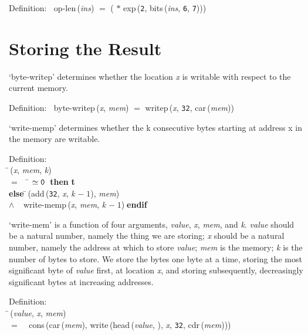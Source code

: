 \begin{tabbing}{\sc Definition}:$\;\;$
{\rm{op-len}}\,({\it{ins\/}}) $=$ ({} $*$ {\rm{exp}}\,({\tt{2}}, {\rm{bits}}\,({\it{ins\/}}, {\tt{6}}, {\tt{7}})))
\end{tabbing}

 \section{Storing the Result}

 `byte-writep' determines whether the location {\it{x\/}} is writable with respect to the current memory.
\begin{tabbing}{\sc Definition}:$\;\;$
{\rm{byte-writep}}\,({\it{x\/}}, {\it{mem\/}}) $=$ {\rm{writep}}\,({\it{x\/}}, {\tt{32}}, {\rm{car}}\,({\it{mem\/}}))
\end{tabbing}

 `write-memp' determines whether the k consecutive bytes starting at address x in the memory are writable.
\begin{tabbing}{\sc Definition}: \\  
\=\,({\it{x\/}}, {\it{mem\/}}, {\it{k\/}}) \\ 
$=$$\;\;\;\;$\= $\simeq {\tt{0}}$$\;\;${\bf then }{\bf{t}} \\ 
{\bf else }\=\,({\rm{add}}\,({\tt{32}}, {\it{x\/}}, {\it{k\/}} $-\;1$), {\it{mem\/}}) \\ 
$\wedge$$\;\;\;\;${\rm{write-memp}}\,({\it{x\/}}, {\it{mem\/}}, {\it{k\/}} $-\;1$)\-$\;${\bf  endif}\-\-
\end{tabbing}
  
 `write-mem' is a function of four arguments, {\it{value\/}}, {\it{x\/}}, {\it{mem\/}}, and {\it{k\/}}.
 {\it{value\/}} should be a natural number, namely the thing we are storing;
 {\it{x\/}} should be a natural number, namely the address at which to store
 {\it{value\/}};  {\it{mem\/}} is the memory;  {\it{k\/}} is the number of bytes to store.  We
 store the bytes one byte at a time, storing the most significant
 byte of {\it{value\/}} first, at location {\it{x\/}}, and storing subsequently,
 decreasingly significant bytes at increasing addresses.
\begin{tabbing}{\sc Definition}: \\  
\=\,({\it{value\/}}, {\it{x\/}}, {\it{mem\/}}) \\ 
$=$$\;\;\;\;${\rm{cons}}\,({\rm{car}}\,({\it{mem\/}}), {\rm{write}}\,({\rm{head}}\,({\it{value\/}}, {}), {\it{x\/}}, {\tt{32}}, {\rm{cdr}}\,({\it{mem\/}})))\-
\end{tabbing}


